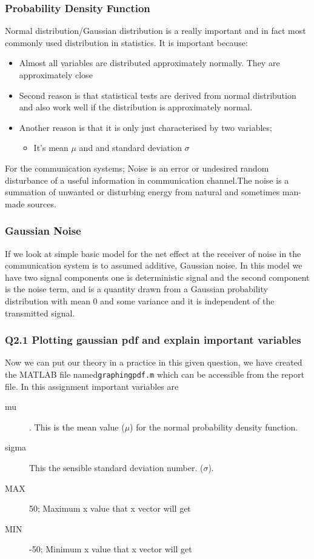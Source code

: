 \documentclass{beamer}
\newcommand{\code}[1]{\texttt{#1}}
\begin{document}
\begin{frame}
	\frametitle{Probability Density Function}

Normal distribution/Gaussian distribution is a really important and in fact most commonly used distribution in statistics.  It is important because:
	\begin{itemize}
		\item Almost all variables are distributed approximately normally. They are approximately close
		\item Second reason is that statistical tests are derived from normal distribution and also work well if the distribution is approximately normal.
		\item Another reason is that it is only just characterised by two variables;
			\begin{itemize}
				\item It's mean $\mu$ and and standard deviation $\sigma$ 
			\end{itemize}
	\end{itemize}
For the communication systems;
Noise is an error or undesired random disturbance of a useful information in communication channel.The noise is a summation of unwanted or disturbing energy from natural and sometimes man-made sources.
\end{frame}
\begin{frame}
	\frametitle{Gaussian Noise}
If we look at simple basic model for the net effect at the receiver of noise in the communication system is to assumed additive, Gaussian noise. In this model we have two signal components one is deterministic signal and  the second component is the noise term, and is a quantity drawn from a Gaussian probability distribution with mean $0$ and some variance and it is  independent of the transmitted signal.
\end{frame}

\begin{frame}
	\frametitle{Q2.1 Plotting gaussian pdf and explain important variables}
Now we can put our theory in a practice in this given question, we have created the MATLAB file named\code{graphingpdf.m} which can be accessible from the report file. In this assignment important variables are

\begin{description}
	\item [mu] . This is the mean value ($\mu$) for the normal probability density function.
	\item [sigma] This the sensible standard deviation number. ($\sigma$).
	\item [MAX] 50; Maximum x value that x vector will get 
	\item [MIN] -50; Minimum x value that x vector will get
\end{description}
\end{frame}
\end{document}
